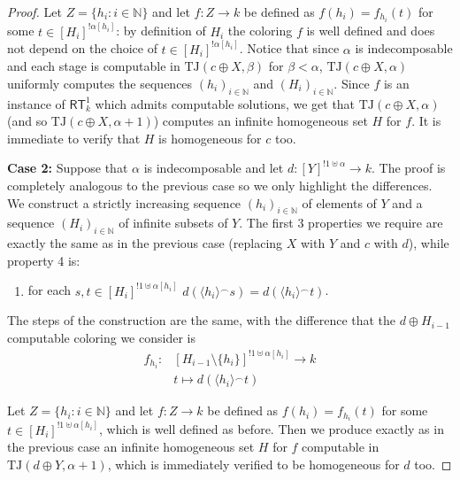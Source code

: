\documentclass[11pt]{amsart}
\theoremstyle{definition}
\theoremstyle{remark}
\theoremstyle{plain}
\newcommand{\numberset}{\mathbb}
\newcommand{\N}{\numberset{N}}
\def\a{\alpha}
\def\b{\beta}
\def\conc{{}^\smallfrown}
\newcommand{\RT}{\mathsf{RT}}
\newcommand{\TJ}{\mathsf{TJ}}
\def\TJ{{\textrm{TJ}}}
\def\N{{\mathbb{N}}}
\begin{document}
\begin{proof}
Let $Z = \{h_i : i \in \N \}$ and let $f \colon Z \to k$ be defined as $f(h_i) = f_{h_i} (t)$ for some $t \in [H_i]^{!\alpha[h_i]}$: by definition of $H_i$ the coloring $f$ is well defined and does not depend on the choice of $t \in [H_i]^{!\alpha[h_i]}$.
Notice that since $\alpha$ is indecomposable and each stage is computable in $\TJ(c \oplus X, \b)$ for $\beta < \alpha$, $\TJ(c \oplus X, \a)$ uniformly computes the sequences $(h_i)_{i \in \N}$ and $(H_i)_{i \in \N}$.
Since $f$ is an instance of $\RT^1_k$ which admits computable solutions, we get that $\TJ(c \oplus X,\a)$ (and so $\TJ(c \oplus X,\a+1)$) computes an infinite homogeneous set $H$ for $f$.
It is immediate to verify that $H$ is homogeneous for $c$ too.

\medskip

\textbf{Case 2:} Suppose that $\alpha$ is indecomposable and let $d \colon [Y]^{! 1 \uplus \alpha} \to k$.
The proof is completely analogous to the previous case so we only highlight the differences.
We construct a strictly increasing sequence $(h_i)_{i \in \N}$ of elements of $Y$ and a sequence $(H_i)_{i \in \N}$ of infinite subsets of $Y$.
The first 3 properties we require are exactly the same as in the previous case (replacing $X$ with $Y$ and $c$ with $d$), while property 4 is:
\begin{enumerate}[start=4]
    \item for each $s,t \in [H_i]^{! 1 \uplus \alpha[h_i]}$ $d(\langle h_i \rangle \conc s) = d(\langle h_i \rangle \conc t)$.
\end{enumerate}

The steps of the construction are the same, with the difference that the $d \oplus H_{i-1}$ computable coloring we consider is
\begin{align*}
    f_{h_i} \colon & [H_{i-1} \setminus \{h_i\}]^{! 1 \uplus \alpha[h_i]} \to k \\
     & t \mapsto d(\langle h_i \rangle \conc t)
\end{align*}
 
Let $Z = \{h_i : i \in \N \}$ and let $f \colon Z \to k$ be defined as $f(h_i) = f_{h_i} (t)$ for some $t \in [H_i]^{! 1 \uplus \alpha[h_i]}$, which is well defined as before.
Then we produce exactly as in the previous case an infinite homogeneous set $H$ for $f$ computable in $\TJ(d \oplus Y, \a+1)$, which is immediately verified to be homogeneous for $d$ too.

\medskip


\end{proof}
\end{document}

